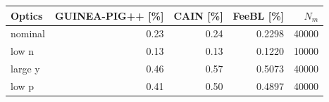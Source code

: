\begin{tabular}{@{}lrrrr@{}}
\toprule
Optics & GUINEA-PIG++ [\%] & CAIN [\%] & FeeBL [\%] & $N_m$\\
\midrule
nominal & 0.23 & 0.24 & 0.2298 & 40000\\
low n & 0.13 & 0.13 & 0.1220 & 10000\\
large y & 0.46 & 0.57 & 0.5073 & 40000\\
low p & 0.41 & 0.50 & 0.4897 & 40000\\
\bottomrule
\end{tabular}
